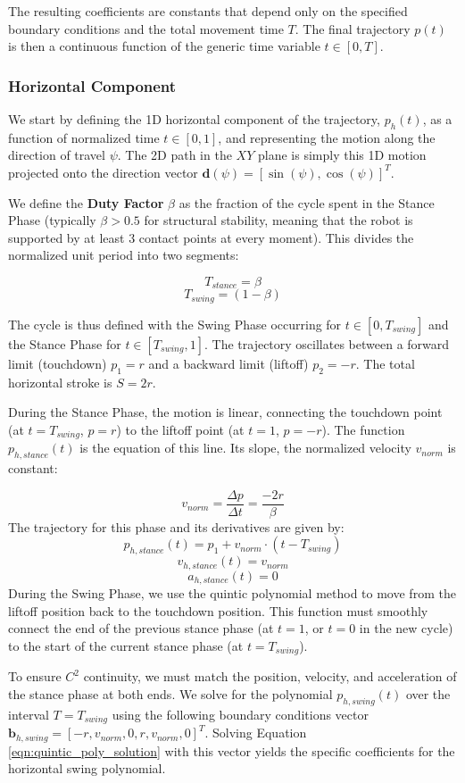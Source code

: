 The resulting coefficients are constants that depend only on the specified boundary conditions and the total
movement time $T$. The final trajectory $p(t)$ is then a continuous function of the generic time variable
$t \in [0, T]$.


\subsubsection{Horizontal Component}

We start by defining the 1D horizontal component of the trajectory, $p_h(t)$, as a function of normalized time
$t \in [0, 1]$, and representing the motion along the direction of travel $\psi$. The 2D path in the $XY$ plane
is simply this 1D motion projected onto the direction vector $\mathbf{d}(\psi) = [\sin(\psi), \cos(\psi)]^T$.

We define the \textbf{Duty Factor} $\beta$ as the fraction of the cycle spent in the Stance Phase (typically
$\beta > 0.5$ for structural stability, meaning that the robot is supported by at least 3 contact points at every
moment). This divides the normalized unit period into two segments:

$$ T_{stance} = \beta $$
$$ T_{swing} = (1-\beta) $$

The cycle is thus defined with the Swing Phase occurring for $t \in [0, T_{swing}]$ and the Stance Phase for
$t \in [T_{swing}, 1]$. The trajectory oscillates between a forward limit (touchdown) $p_1 = r$ and a backward
limit (liftoff) $p_2 = -r$. The total horizontal stroke is $S = 2r$.

During the Stance Phase, the motion is linear, connecting the touchdown point (at $t = T_{swing}$, $p = r$) to
the liftoff point (at $t = 1$, $p = -r$). The function $p_{h,stance}(t)$ is the equation of this line. Its slope,
the normalized velocity $v_{norm}$ is constant:

$$ v_{norm} = \frac{\Delta p}{\Delta t} = \frac{-2r}{\beta} $$
The trajectory for this phase and its derivatives are given by:
$$ p_{h,stance}(t) = p_1 + v_{norm} \cdot (t - T_{swing}) $$
$$ v_{h,stance}(t) = v_{norm} $$
$$ a_{h,stance}(t) = 0 $$
During the Swing Phase, we use the quintic polynomial method to move from the liftoff position back to the
touchdown position. This function must smoothly connect the end of the previous stance phase (at $t = 1$,
or $t = 0$ in the new cycle) to the start of the current stance phase (at $t = T_{swing}$).

To ensure $C^2$ continuity, we must match the position, velocity, and acceleration of the stance phase at both
ends. We solve for the polynomial $p_{h,swing}(t)$ over the interval $T = T_{swing}$ using the following
boundary conditions vector $\mathbf{b}_{h,swing} = [-r, v_{norm}, 0, r, v_{norm}, 0]^T$.
Solving Equation \ref{eqn:quintic_poly_solution} with this vector yields the specific coefficients for the
horizontal swing polynomial.


